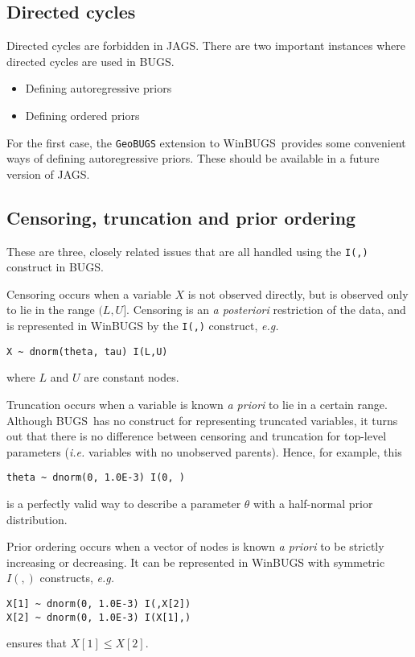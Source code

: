 \documentclass[11pt, a4paper, titlepage]{report}
\newcommand{\JAGS}{\textsf{JAGS}}
\newcommand{\BUGS}{\textsf{BUGS}}
\newcommand{\WinBUGS}{\textsf{WinBUGS}}
\begin{document}
\subsection{Directed cycles}

Directed cycles are forbidden in \JAGS. There are two important
instances where directed cycles are used in \BUGS.
\begin{itemize}
\item Defining autoregressive priors
\item Defining ordered priors
\end{itemize}
For the first case, the \texttt{GeoBUGS} extension to \WinBUGS\ provides
some convenient ways of defining autoregressive priors. These should be
available in a future version of \JAGS.

\subsection{Censoring, truncation and prior ordering}
\label{section:censoring}

These are three, closely related issues that are all handled using
the \texttt{I(,)} construct in \BUGS.

Censoring occurs when a variable $X$ is not observed directly,
but is observed only to lie in the range $(L,U]$.  Censoring is
an {\em a posteriori} restriction of the data, and is represented
in WinBUGS by the \texttt{I(,)} construct, {\em e.g.}
\begin{verbatim}
X ~ dnorm(theta, tau) I(L,U)
\end{verbatim}
where $L$ and $U$ are constant nodes.

Truncation occurs when a variable is known {\em a priori} to lie in
a certain range.  Although \BUGS\ has no construct for representing
truncated variables, it turns out that there is no difference between
censoring and truncation for top-level parameters ({\em i.e.} variables
with no unobserved parents).  Hence, for example, this
\begin{verbatim}
theta ~ dnorm(0, 1.0E-3) I(0, )
\end{verbatim}
is a perfectly valid way to describe a parameter $\theta$ with a
half-normal prior distribution.

Prior ordering occurs when a vector of nodes is known {\em a priori}
to be strictly increasing or decreasing. It can be represented in
WinBUGS with symmetric $I(,)$ constructs,  {\em e.g.}
\begin{verbatim}
X[1] ~ dnorm(0, 1.0E-3) I(,X[2])
X[2] ~ dnorm(0, 1.0E-3) I(X[1],)
\end{verbatim}
ensures that $X[1] \leq X[2]$.
\end{document}

